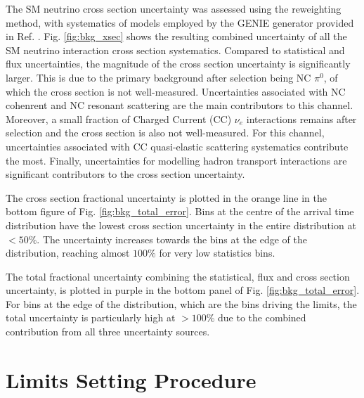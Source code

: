 The SM neutrino cross section uncertainty was assessed using the reweighting method, with systematics of models employed by the GENIE generator provided in Ref. \cite{genie_tune}.
Fig. \ref{fig:bkg_xsec} shows the resulting combined uncertainty of all the SM neutrino interaction cross section systematics.
Compared to statistical and flux uncertainties, the magnitude of the cross section uncertainty is significantly larger.
This is due to the primary background after selection being NC $\pi^0$, of which the cross section is not well-measured.  
Uncertainties associated with NC cohenrent and NC resonant scattering are the main contributors to this channel.
Moreover, a small fraction of Charged Current (CC) $\nu_e$ interactions remains after selection and the cross section is also not well-measured.
For this channel, uncertainties associated with CC quasi-elastic scattering systematics contribute the most.
Finally, uncertainties for modelling hadron transport interactions are significant contributors to the cross section uncertainty.

The cross section fractional uncertainty is plotted in the orange line in the bottom figure of Fig. \ref{fig:bkg_total_error}.
Bins at the centre of the arrival time distribution have the lowest cross section uncertainty in the entire distribution at $< 50\%$.
The uncertainty increases towards the bins at the edge of the distribution, reaching almost $100 \%$ for very low statistics bins.

The total fractional uncertainty combining the statistical, flux and cross section uncertainty, is plotted in purple in the bottom panel of Fig. \ref{fig:bkg_total_error}.
For bins at the edge of the distribution, which are the bins driving the limits, the total uncertainty is particularly high at $> 100\%$ due to the combined contribution from all three uncertainty sources.


\section{Limits Setting Procedure}
\label{sec:limit_procedure}


